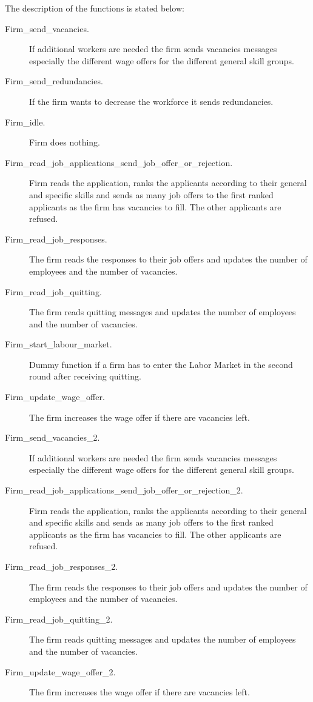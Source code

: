 The description of the functions is stated below:
\begin{description}
\item[Firm\_send\_vacancies.] If additional workers are needed the firm sends
vacancies messages
 especially the different wage offers for the different general skill groups.
\item[Firm\_send\_redundancies.] If the firm wants to
decrease the workforce it sends redundancies.
\item[Firm\_idle.] Firm does nothing.
\item[Firm\_read\_job\_applications\_send\_job\_offer\_or\_rejection.] Firm reads the application, ranks the
applicants according to their general and specific skills and sends
as many job offers to the first ranked applicants as the firm has
vacancies to fill. The other applicants are refused.
\item[Firm\_read\_job\_responses.] The firm reads
the responses to their job offers and updates the number of
employees and the number of vacancies.
\item[Firm\_read\_job\_quitting.] The firm reads quitting messages and updates the number
of employees and the number of vacancies.
\item[Firm\_start\_labour\_market.] Dummy function if a firm has to enter the Labor Market
in the second round after receiving quitting.
\item[Firm\_update\_wage\_offer.] The firm increases the wage offer if there are vacancies
 left.
\item[Firm\_send\_vacancies\_2.] If additional workers are needed the firm sends vacancies messages
 especially the different wage offers for the different general skill groups.
\item[Firm\_read\_job\_applications\_send\_job\_offer\_or\_rejection\_2.]
Firm reads the application, ranks the applicants according to their
general and specific skills and sends as many job offers to the
first ranked applicants as the firm has vacancies to fill. The other
applicants are refused.
\item[Firm\_read\_job\_responses\_2.] The firm
reads the responses to their job offers and updates the number of
employees and the number of vacancies.
\item[Firm\_read\_job\_quitting\_2.] The firm reads quitting messages and updates the number
of employees and the number of vacancies.
\item[Firm\_update\_wage\_offer\_2.] The
firm increases the wage offer if there are vacancies left.

\end{description}

